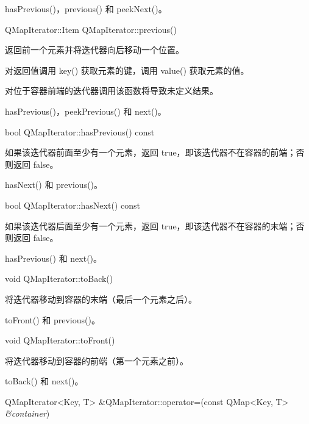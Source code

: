 \begin{seeAlso}
hasPrevious()，previous() 和 peekNext()。
\end{seeAlso}

\splitLine

QMapIterator::Item QMapIterator::previous()

返回前一个元素并将迭代器向后移动一个位置。

对返回值调用 key() 获取元素的键，调用 value() 获取元素的值。

对位于容器前端的迭代器调用该函数将导致未定义结果。


\begin{seeAlso}
hasPrevious()，peekPrevious() 和 next()。
\end{seeAlso}

\splitLine

bool QMapIterator::hasPrevious() const

如果该迭代器前面至少有一个元素，返回 true，即该迭代器不在容器的前端；否则返回 false。

\begin{seeAlso}
hasNext() 和 previous()。
\end{seeAlso}

\splitLine

bool QMapIterator::hasNext() const

如果该迭代器后面至少有一个元素，返回 true，即该迭代器不在容器的末端；否则返回 false。

\begin{seeAlso}
hasPrevious() 和 next()。
\end{seeAlso}

\splitLine

void QMapIterator::toBack()

将迭代器移动到容器的末端（最后一个元素之后）。

\begin{seeAlso}
toFront() 和 previous()。
\end{seeAlso}

\splitLine

void QMapIterator::toFront()

将迭代器移动到容器的前端（第一个元素之前）。

\begin{seeAlso}
toBack() 和 next()。
\end{seeAlso}

\splitLine

QMapIterator<Key, T> \&QMapIterator::operator=(const QMap<Key, T> \emph{\&container})

